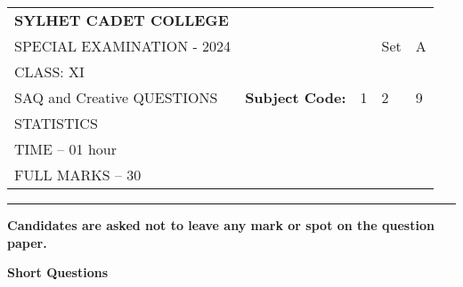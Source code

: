 \documentclass{exam}
\begin{document}
\begin{table}[h]
\centering
\begin{tabular}{lllll}
\textbf{\large SYLHET CADET COLLEGE} &  &  &  &  \\ \cline{4-5} 
SPECIAL EXAMINATION - 2024 &  & \multicolumn{1}{l|}{} & \multicolumn{1}{l|}{Set} & \multicolumn{1}{l|}{A} \\ \cline{4-5} 
CLASS: XI &  &  &  &  \\ \cline{3-5} 
SAQ and Creative QUESTIONS & \multicolumn{1}{l|}{\textbf{Subject Code:}} & \multicolumn{1}{l|}{1} & \multicolumn{1}{l|}{2} & \multicolumn{1}{l|}{9} \\ \cline{3-5} 
STATISTICS &  &  &  &  \\
TIME – 01 hour &  &  &  &  \\
FULL MARKS – 30 &  &  &  & 
\end{tabular}
\end{table}
\hrule

\begin{center}

  \textbf{Candidates are asked not to leave any mark or spot on the question paper.}
\end{center}

\textbf{Short Questions}

\onehalfspacing %
\end{document}
